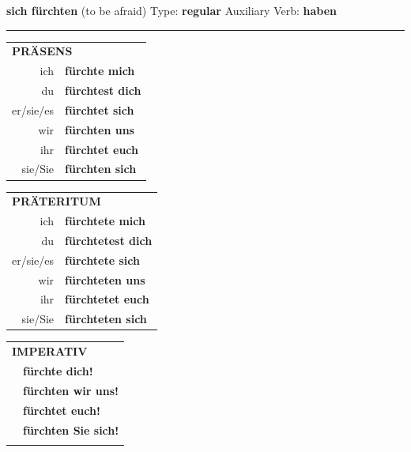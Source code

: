 \documentclass[10pt,a4paper]{revtex4-2}
\begin{document}
\begin{verbbox}
    {\Large \bf sich fürchten} (to be afraid) \hfill Type: \textbf{regular} \hfill Auxiliary Verb: \textbf{haben} 
    
     \vspace{5pt}

    \hrule
    
    \vspace{5pt}

  \begin{tabular}{rl}
     \multicolumn{2}{l}{\textbf{PRÄSENS} }\\
    ich & \textbf{fürchte mich}\\
    du & \textbf{fürchtest dich}\\
    er/sie/es & \textbf{fürchtet sich}\\
    wir & \textbf{fürchten uns}\\
    ihr & \textbf{fürchtet euch}\\
    sie/Sie & \textbf{fürchten sich}\\
  \end{tabular}
  \hfill
     \begin{tabular}{rl}
    \multicolumn{2}{l}{\textbf{PRÄTERITUM} }\\
    ich & \textbf{fürchtete mich}\\
    du & \textbf{fürchtetest dich}\\
    er/sie/es & \textbf{fürchtete sich}\\
    wir & \textbf{fürchteten uns}\\
    ihr & \textbf{fürchtetet euch}\\
    sie/Sie & \textbf{fürchteten sich}\\
  \end{tabular}
  \hfill
  \begin{tabular}{rl}
     \multicolumn{2}{l}{\textbf{IMPERATIV} }\\
   & \textbf{fürchte dich!}\\
   & \textbf{fürchten wir uns!}\\
   & \textbf{fürchtet euch!}\\
   & \textbf{fürchten Sie sich!}\\
   & \vspace{10pt}
  \end{tabular}

    \vspace{10pt}


\end{verbbox}
\end{document}
